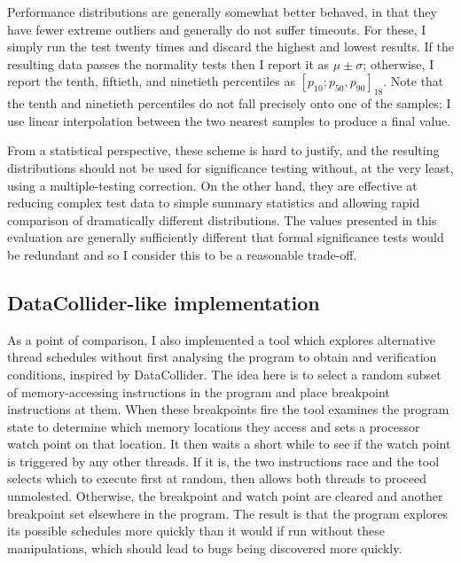Performance distributions are generally somewhat better behaved, in
that they have fewer extreme outliers and generally do not suffer
timeouts.  For these, I simply run the test twenty times and discard
the highest and lowest results.  If the resulting data passes the
normality tests then I report it as $\mu \pm \sigma$; otherwise, I
report the tenth, fiftieth, and ninetieth percentiles as $[p_{10};
  p_{50}, p_{90}]_{18}$.  Note that the tenth and ninetieth
percentiles do not fall precisely onto one of the samples; I use
linear interpolation between the two nearest samples to produce a
final value.

From a statistical perspective, these scheme is hard to justify, and
the resulting distributions should not be used for significance
testing without, at the very least, using a multiple-testing
correction.  On the other hand, they are effective at reducing complex
test data to simple summary statistics and allowing rapid comparison
of dramatically different distributions.  The values presented in this
evaluation are generally sufficiently different that formal
significance tests would be redundant and so I consider this to be a
reasonable trade-off.


\subsection{DataCollider-like implementation}
\label{sect:eval:datacollider}

As a point of comparison, I also implemented a tool which explores
alternative thread schedules without first analysing the program to
obtain {\StateMachines} and verification conditions, inspired by
DataCollider\needCite{}.  The idea here is to select a random subset
of memory-accessing instructions in the program and place breakpoint
instructions at them.  When these breakpoints fire the tool examines
the program state to determine which memory locations they access and
sets a processor watch point\needCite{} on that location.  It then
waits a short while to see if the watch point is triggered by any
other threads.  If it is, the two instructions race and the tool
selects which to execute first at random, then allows both threads to
proceed unmolested.  Otherwise, the breakpoint and watch point are
cleared and another breakpoint set elsewhere in the program.  The
result is that the program explores its possible schedules more
quickly than it would if run without these manipulations, which should
lead to bugs being discovered more quickly.

